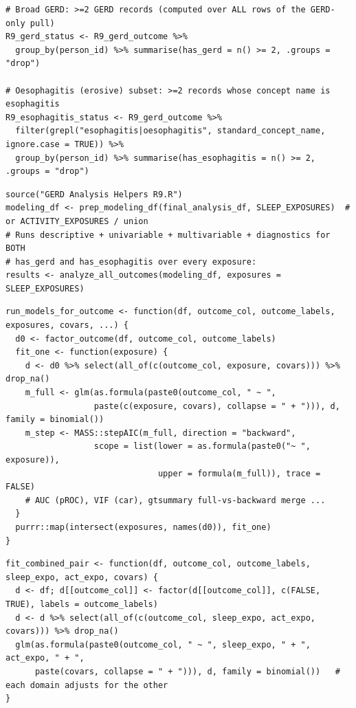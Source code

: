 \documentclass[11pt]{article}
\begin{document}
\begin{lstlisting}[caption={Two nested outcomes from one GERD pull (analysis files).}]
# Broad GERD: >=2 GERD records (computed over ALL rows of the GERD-only pull)
R9_gerd_status <- R9_gerd_outcome %>%
  group_by(person_id) %>% summarise(has_gerd = n() >= 2, .groups = "drop")

# Oesophagitis (erosive) subset: >=2 records whose concept name is esophagitis
R9_esophagitis_status <- R9_gerd_outcome %>%
  filter(grepl("esophagitis|oesophagitis", standard_concept_name, ignore.case = TRUE)) %>%
  group_by(person_id) %>% summarise(has_esophagitis = n() >= 2, .groups = "drop")
\end{lstlisting}

\begin{lstlisting}[caption={The shared driver: both outcomes, one exposure set.}]
source("GERD Analysis Helpers R9.R")
modeling_df <- prep_modeling_df(final_analysis_df, SLEEP_EXPOSURES)  # or ACTIVITY_EXPOSURES / union
# Runs descriptive + univariable + multivariable + diagnostics for BOTH
# has_gerd and has_esophagitis over every exposure:
results <- analyze_all_outcomes(modeling_df, exposures = SLEEP_EXPOSURES)
\end{lstlisting}

\begin{lstlisting}[caption={Per-exposure adjusted modeling inside the engine (abridged).}]
run_models_for_outcome <- function(df, outcome_col, outcome_labels, exposures, covars, ...) {
  d0 <- factor_outcome(df, outcome_col, outcome_labels)
  fit_one <- function(exposure) {
    d <- d0 %>% select(all_of(c(outcome_col, exposure, covars))) %>% drop_na()
    m_full <- glm(as.formula(paste0(outcome_col, " ~ ",
                  paste(c(exposure, covars), collapse = " + "))), d, family = binomial())
    m_step <- MASS::stepAIC(m_full, direction = "backward",
                  scope = list(lower = as.formula(paste0("~ ", exposure)),
                               upper = formula(m_full)), trace = FALSE)
    # AUC (pROC), VIF (car), gtsummary full-vs-backward merge ...
  }
  purrr::map(intersect(exposures, names(d0)), fit_one)
}
\end{lstlisting}

\begin{lstlisting}[caption={Combined mutually-adjusted model: sleep + activity together.}]
fit_combined_pair <- function(df, outcome_col, outcome_labels, sleep_expo, act_expo, covars) {
  d <- df; d[[outcome_col]] <- factor(d[[outcome_col]], c(FALSE, TRUE), labels = outcome_labels)
  d <- d %>% select(all_of(c(outcome_col, sleep_expo, act_expo, covars))) %>% drop_na()
  glm(as.formula(paste0(outcome_col, " ~ ", sleep_expo, " + ", act_expo, " + ",
      paste(covars, collapse = " + "))), d, family = binomial())   # each domain adjusts for the other
}
\end{lstlisting}
\end{document}
